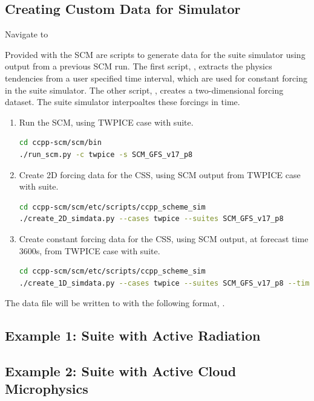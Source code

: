 \subsection{Creating Custom Data for Simulator}
\label{section:Creating_Custom_Data_for_Simulator}

Navigate to 

Provided with the SCM are scripts to generate data for the suite simulator using output from a previous SCM run. The first script, , extracts the physics tendencies from a user specified time interval, which are used for constant forcing in the suite simulator. The other script, , creates a two-dimensional forcing dataset. The suite simulator interpoaltes these forcings in time.

\begin{enumerate}
\item Run the SCM, using TWPICE case with  suite.
\begin{lstlisting}[language=bash]
cd ccpp-scm/scm/bin
./run_scm.py -c twpice -s SCM_GFS_v17_p8
\end{lstlisting}
\item Create 2D forcing data for the CSS, using SCM output from TWPICE case with  suite.
\begin{lstlisting}[language=bash]
cd ccpp-scm/scm/etc/scripts/ccpp_scheme_sim
./create_2D_simdata.py --cases twpice --suites SCM_GFS_v17_p8
\end{lstlisting}
\item Create constant forcing data for the CSS, using SCM output, at forecast time 3600s, from TWPICE case with  suite.
\begin{lstlisting}[language=bash]
cd ccpp-scm/scm/etc/scripts/ccpp_scheme_sim
./create_1D_simdata.py --cases twpice --suites SCM_GFS_v17_p8 --time 3600
\end{lstlisting}
\end{enumerate}

The data file will be written to  with the following format, .

\subsection{Example 1: Suite with Active Radiation}

\subsection{Example 2: Suite with Active Cloud Microphysics }
